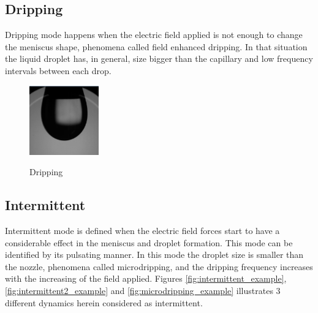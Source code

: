\subsection{Dripping}
\label{subsec:dripping}

Dripping mode happens when the electric field applied is not enough to change the meniscus shape, phenomena called field enhanced dripping.
In that situation the liquid droplet has, in general, size bigger than the capillary and low frequency intervals between each drop.

\begin{figure}[H]
  \center
  \includegraphics[width=3cm]{Figuras/19:03/drip_example.png}
  \label{fig:drip_example}
  \caption{Dripping}
\end{figure}

\subsection{Intermittent}
\label{subsec:Intermittent}

Intermittent mode is defined when the electric field forces start to have a considerable effect in the meniscus and droplet formation. 
This mode can be identified by its pulsating manner.
In this mode the droplet size is smaller than the nozzle, phenomena called microdripping, and the dripping frequency increases with the increasing of the field applied.
Figures \ref{fig:intermittent_example}, \ref{fig:intermittent2_example} and \ref{fig:microdripping_example} illustrates 3 different dynamics herein considered as intermittent.

